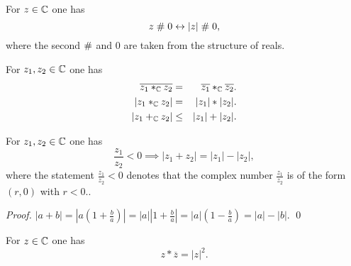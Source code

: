 \begin{lemma}For $z\in\mathbb{C}$ one has
$$z\mathrel{\#} 0 \leftrightarrow |z| \mathrel{\#} 0,$$
where the second $\mathrel{\#}$ and $0$ are taken from the structure of reals.
\end{lemma}


\begin{proposition}
For $z_1,z_2\in \mathbb{C}$ one has
\begin{eqnarray*}
\overline{z_1*_{\mathbb{C}} z_2}&=&\overline{z_1}*_{\mathbb{C}}\overline{z_2}.\\
|z_1*_{\mathbb{C}} z_2|&=&|z_1|*|z_2|.\\
|z_1+_{\mathbb{C}} z_2|&\leq& |z_1|+|z_2|.
\end{eqnarray*}
\end{proposition}

\begin{lemma} For $z_1, z_2\in\mathbb{C}$ one has
$$\frac{z_1}{z_2}< 0 \implies |z_1+z_2| = |z_1|-|z_2|,$$
where the statement $ \frac{z_1}{z_2}< 0$ denotes that the complex
number  $ \frac{z_1}{z_2}$ is of the form $(r,0)$ with $r<0$..
\end{lemma}

\begin{proof}
$|a+b| = |a(1+\frac{b}{a})| = |a| |1+\frac{b}{a}| = |a|
  (1-\frac{b}{a}) = |a|-|b|$.
  \qed
\end{proof}
\begin{lemma}
For $z\in \mathbb{C}$ one has
$$z*\overline{z} = |z|^2.$$
\end{lemma}


